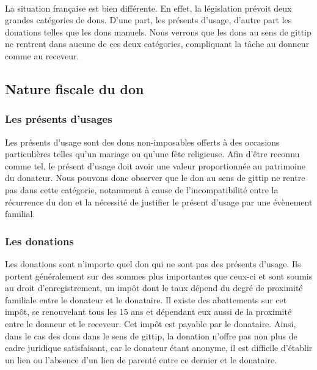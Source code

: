         \paragraph{}
            La situation française est bien différente. En effet, la
            législation prévoit deux grandes catégories de dons. D'une
            part, les présents d'usage, d'autre part les donations
            telles que les dons manuels. Nous verrons que les dons au sens
            de gittip ne rentrent dans aucune de ces deux catégories,
            compliquant la tâche au donneur comme au receveur.

        \subsection{Nature fiscale du don}
            
            \subsubsection{Les présents d'usages}
                Les présents d'usage sont des dons non-imposables offerts à des
                occasions particulières telles qu'un mariage ou qu'une fête
                religieuse.
                Afin d'être reconnu comme tel, le présent d'usage doit avoir une 
                valeur proportionnée au patrimoine du donateur.
                Nous pouvons donc observer que le don au sens de gittip ne rentre
                pas dans cette catégorie, notamment à cause de l'incompatibilité
                entre la récurrence du don et la nécessité de justifier
                le présent d'usage par une évènement familial.

            \subsubsection{Les donations}
                Les donations sont n'importe quel don qui ne sont pas des présents
                d'usage. Ils portent généralement sur des sommes plus importantes
                que ceux-ci et sont soumis au droit d'enregistrement, un impôt
                dont le taux dépend du degré de proximité familiale entre le
                donateur et le donataire.
                Il existe des abattements sur cet impôt, se renouvelant tous
                les 15 ans et dépendant eux aussi de la proximité entre le
                donneur et le receveur. Cet impôt est payable par le donataire.
                Ainsi, dans le cas des dons dans le sens de gittip, la donation
                n'offre pas non plus de cadre juridique satisfaisant, car le 
                donateur étant anonyme, il est difficile d'établir un lien ou 
                l'absence d'un lien de parenté entre ce dernier et le donataire.

